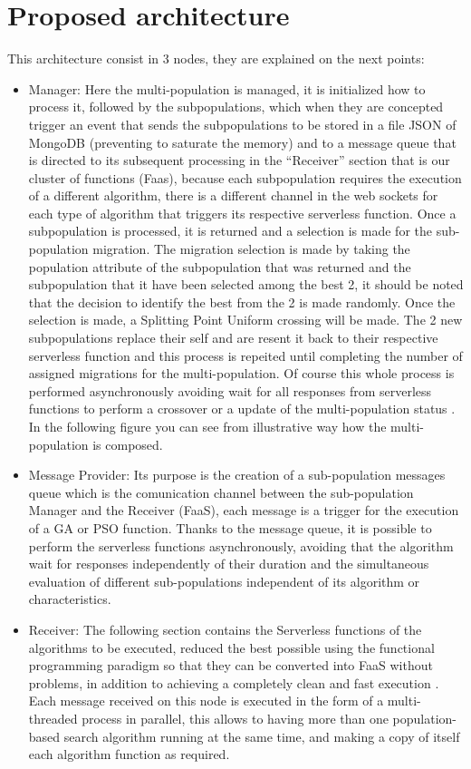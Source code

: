 \documentclass[runningheads]{llncs}
\begin{document}
\section{Proposed architecture}

This architecture consist in 3 nodes, they are explained on the next points:

\begin{itemize}
  \item Manager: Here the multi-population is managed, it is initialized how to process it, 
  followed by the subpopulations, which when they are concepted trigger an event that sends 
  the subpopulations to be stored in a file JSON of MongoDB (preventing to saturate the memory) 
  and to a message queue that is directed to its subsequent processing in the “Receiver” section 
  that is our cluster of functions (Faas), because each subpopulation requires the execution of a 
  different algorithm, there is a different channel in the web sockets for each type of algorithm 
  that triggers its respective serverless function.
  Once a subpopulation is processed, it is returned and a selection is made for the sub-population 
  migration. The migration selection is made by taking the population attribute of the subpopulation 
  that was returned and the subpopulation that it have been selected among the best 2, it should be 
  noted that the decision to identify the best from the 2 is made randomly. Once the selection is made, 
  a Splitting Point Uniform crossing will be made.
  The 2 new subpopulations replace their self and are resent it back to their respective
serverless function and this process is repeited until completing the number of assigned migrations
for the multi-population. Of course this whole process is performed asynchronously avoiding wait for all responses from serverless functions to perform a crossover or a
update of the multi-population status \cite{Lovbjerg2001,Jimeno2019}. In the following figure you can see from
illustrative way how the multi-population is composed.
\item Message Provider: Its purpose is the creation of a sub-population messages queue which is the 
comunication channel between the sub-population Manager and the Receiver (FaaS), each message is a 
trigger for the execution of a GA or PSO function. Thanks to the message queue, it is possible to perform 
the serverless functions asynchronously, avoiding that the algorithm wait for responses independently of 
their duration and the simultaneous evaluation of different sub-populations independent of its algorithm 
or characteristics.
\item Receiver: The following section contains the Serverless functions of the algorithms to be executed, 
reduced the best possible using the functional programming paradigm so that they can be converted into FaaS 
without problems, in addition to achieving a completely clean and fast execution \cite{Roberts2016} . Each message received 
on this node is executed in the form of a multi-threaded process in parallel, this allows to having more than 
one population-based search algorithm running at the same time, and making a copy of itself each algorithm 
function as required.
\end{itemize}
\end{document}
